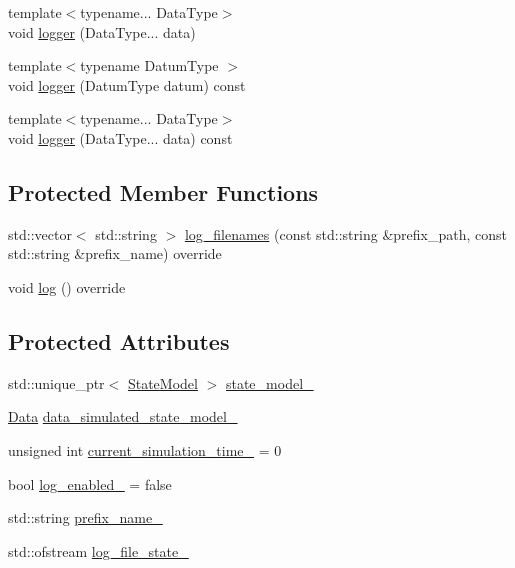 \begin{DoxyCompactItemize}
{\footnotesize template$<$typename... Data\+Type$>$ }\\void \mbox{\hyperlink{classbfl_1_1Logger_aca2086c9256e5c404872b91f7f25b97d}{logger}} (Data\+Type... data)
\item 
{\footnotesize template$<$typename Datum\+Type $>$ }\\void \mbox{\hyperlink{classbfl_1_1Logger_a50b1c109730fa98f66e66f420f0158fe}{logger}} (Datum\+Type datum) const
\item 
{\footnotesize template$<$typename... Data\+Type$>$ }\\void \mbox{\hyperlink{classbfl_1_1Logger_a0f0cf7ce956546d94dfb1feb7cebf171}{logger}} (Data\+Type... data) const
\end{DoxyCompactItemize}
\subsection*{Protected Member Functions}
\begin{DoxyCompactItemize}
\item 
std\+::vector$<$ std\+::string $>$ \mbox{\hyperlink{classbfl_1_1SimulatedStateModel_ab4212871b8ca425855ec351c13dc3052}{log\+\_\+filenames}} (const std\+::string \&prefix\+\_\+path, const std\+::string \&prefix\+\_\+name) override
\item 
void \mbox{\hyperlink{classbfl_1_1SimulatedStateModel_aa022eb0d50d898ffcc831af2907265b2}{log}} () override
\end{DoxyCompactItemize}
\subsection*{Protected Attributes}
\begin{DoxyCompactItemize}
\item 
std\+::unique\+\_\+ptr$<$ \mbox{\hyperlink{classbfl_1_1StateModel}{State\+Model}} $>$ \mbox{\hyperlink{classbfl_1_1SimulatedStateModel_a02e90a22420f8bbec12b97a1f46c987c}{state\+\_\+model\+\_\+}}
\item 
\mbox{\hyperlink{namespacebfl_af6b103c6821db1b54452f776fdd9dd02}{Data}} \mbox{\hyperlink{classbfl_1_1SimulatedStateModel_a865eeb0f3df65b4fbdbc512b354a219f}{data\+\_\+simulated\+\_\+state\+\_\+model\+\_\+}}
\item 
unsigned int \mbox{\hyperlink{classbfl_1_1SimulatedStateModel_ae81c0eee264cc44d0387662569c99b9e}{current\+\_\+simulation\+\_\+time\+\_\+}} = 0
\item 
bool \mbox{\hyperlink{classbfl_1_1SimulatedStateModel_aa658259f46cf58300c8b4ef709c7b35f}{log\+\_\+enabled\+\_\+}} = false
\item 
std\+::string \mbox{\hyperlink{classbfl_1_1SimulatedStateModel_ab11657163e794ff486e800dd80cd361d}{prefix\+\_\+name\+\_\+}}
\item 
std\+::ofstream \mbox{\hyperlink{classbfl_1_1SimulatedStateModel_afe3aa6ccfb3090f05ea7386150749540}{log\+\_\+file\+\_\+state\+\_\+}}
\end{DoxyCompactItemize}
